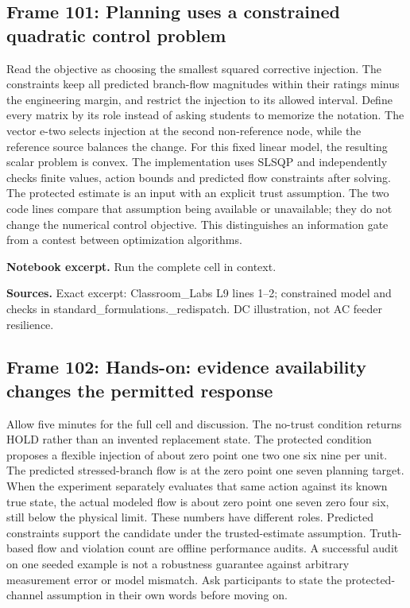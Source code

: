 \documentclass[11pt]{article}
\begin{document}
\subsection*{Frame 101: Planning uses a constrained quadratic control problem}
Read the objective as choosing the smallest squared corrective injection. The constraints keep all predicted branch-flow magnitudes within their ratings minus the engineering margin, and restrict the injection to its allowed interval. Define every matrix by its role instead of asking students to memorize the notation. The vector e-two selects injection at the second non-reference node, while the reference source balances the change. For this fixed linear model, the resulting scalar problem is convex. The implementation uses SLSQP and independently checks finite values, action bounds and predicted flow constraints after solving. The protected estimate is an input with an explicit trust assumption. The two code lines compare that assumption being available or unavailable; they do not change the numerical control objective. This distinguishes an information gate from a contest between optimization algorithms.\par
\par\noindent\begin{minipage}{\linewidth}\textbf{Notebook excerpt.} Run the complete cell in context.\par \end{minipage}\par
\par\nopagebreak\begin{minipage}{\linewidth}{\footnotesize\color{slate}\textbf{Sources.} Exact excerpt: Classroom\_Labs L9 lines 1--2; constrained model and checks in standard\_formulations.\_redispatch. DC illustration, not AC feeder resilience.\par}\end{minipage}\par\medskip
\subsection*{Frame 102: Hands-on: evidence availability changes the permitted response}
Allow five minutes for the full cell and discussion. The no-trust condition returns HOLD rather than an invented replacement state. The protected condition proposes a flexible injection of about zero point one two one six nine per unit. The predicted stressed-branch flow is at the zero point one seven planning target. When the experiment separately evaluates that same action against its known true state, the actual modeled flow is about zero point one seven zero four six, still below the physical limit. These numbers have different roles. Predicted constraints support the candidate under the trusted-estimate assumption. Truth-based flow and violation count are offline performance audits. A successful audit on one seeded example is not a robustness guarantee against arbitrary measurement error or model mismatch. Ask participants to state the protected-channel assumption in their own words before moving on.\par
\end{document}

